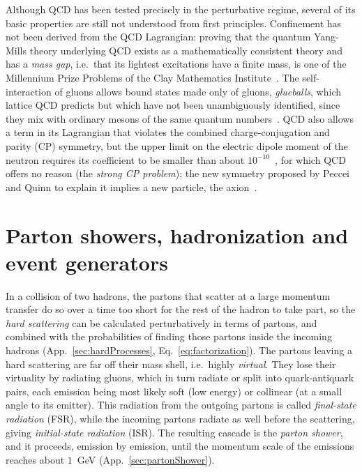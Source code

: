 Although QCD has been tested precisely in the perturbative regime, several of its basic properties are still not understood from first principles.
%
Confinement has not been derived from the QCD Lagrangian: proving that the quantum Yang-Mills theory underlying QCD exists as a mathematically consistent theory and has a \emph{mass gap}, i.e.\ that its lightest excitations have a finite mass, is one of the Millennium Prize Problems of the Clay Mathematics Institute~\cite{Jaffe:2000ne}.
%
The self-interaction of gluons allows bound states made only of gluons, \emph{glueballs}, which lattice QCD predicts but which have not been unambiguously identified, since they mix with ordinary mesons of the same quantum numbers~\cite{Mathieu:2008me}.
%
QCD also allows a term in its Lagrangian that violates the combined charge-conjugation and parity (CP) symmetry, but the upper limit on the electric dipole moment of the neutron requires its coefficient to be smaller than about \(10^{-10}\)~\cite{ParticleDataGroup:2026aaa}, for which QCD offers no reason (the \emph{strong CP problem}); the new symmetry proposed by Peccei and Quinn to explain it implies a new particle, the axion~\cite{Peccei:1977hh}.

\section{Parton showers, hadronization and event generators}
\label{sec:eventGenerators}
In a collision of two hadrons, the partons that scatter at a large momentum transfer do so over a time too short for the rest of the hadron to take part, so the \emph{hard scattering} can be calculated perturbatively in terms of partons, and combined with the probabilities of finding those partons inside the incoming hadrons (App.~\ref{sec:hardProcesses}, Eq.~\ref{eq:factorization}).
%
The partons leaving a hard scattering are far off their mass shell, i.e.\ highly \emph{virtual}.
%
They lose their virtuality by radiating gluons, which in turn radiate or split into quark-antiquark pairs, each emission being most likely soft (low energy) or collinear (at a small angle to its emitter).
%
This radiation from the outgoing partons is called \emph{final-state radiation} (FSR), while the incoming partons radiate as well before the scattering, giving \emph{initial-state radiation} (ISR).
%
The resulting cascade is the \emph{parton shower}, and it proceeds, emission by emission, until the momentum scale of the emissions reaches about \(1\)~GeV (App.~\ref{sec:partonShower}).

